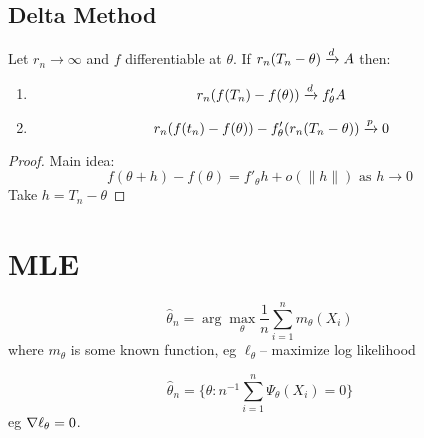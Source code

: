 \documentclass{article}
\begin{document}
\subsection{Delta Method}
\begin{theorem}
Let $r_n\to \infty$ and $f$ differentiable at $\theta$. If $r_n (T_n -\theta)\xrightarrow{d} A$ then:
\begin{enumerate}
	\item $$r_n(f(T_n) - f(\theta)) \xrightarrow{d} f'_\theta A$$
	\item $$r_n(f(t_n) - f(\theta)) - f_\theta'(r_n (T_n - \theta)) \xrightarrow{p} 0$$
\end{enumerate}
\begin{proof}
	Main idea:
	$$f(\theta + h) - f(\theta) = f'_\theta h + o(\|h \|) \text{ as } h\to 0$$
	Take $h = T_n - \theta$ 
\end{proof}



\end{theorem}
\begin{theorem}
\end{theorem}

\begin{example}[...]
\end{example}

\section{MLE}
\begin{definition}[M-estimators]
$$\hat \theta_n = \arg \max_\theta \frac{1}{n} \sum_{i=1}^n m_\theta(X_i)$$
where $m_\theta$ is some known function, eg $\ell_\theta$-- maximize log likelihood 

\end{definition}
\begin{definition}[Z-estimator]
$$\hat \theta _n = \{\theta: n^{-1} \sum_{i=1}^n \Psi_\theta(X_i) = 0\}$$
eg $\nabla \ell_\theta = 0$. 
\end{definition}
\end{document}
